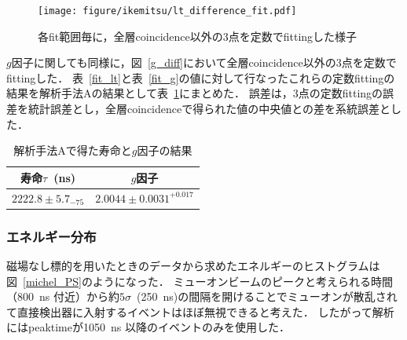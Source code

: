   \begin{figure}[H]
   \centering
   \texttt{[image: figure/ikemitsu/lt\_difference\_fit.pdf]}
   \caption{各fit範囲毎に，全層coincidence以外の3点を定数でfittingした様子}
   \label{lt_diff_fit}
  \end{figure}

  $g$因子に関しても同様に，図~\ref{g_diff}において全層coincidence以外の3点を定数でfittingした．
  表~\ref{fit_lt}と表~\ref{fit_g}の値に対して行なったこれらの定数fittingの結果を解析手法Aの結果として表~\ref{kaisekiA_matome}にまとめた．
  誤差は，3点の定数fittingの誤差を統計誤差とし，全層coincidenceで得られた値の中央値との差を系統誤差とした．

  \begin{table}[H]
   \caption{解析手法Aで得た寿命と$g$因子の結果}
   \label{kaisekiA_matome}
   \begin{center}
    \begin{tabular}{cc}\toprule
     寿命$\tau$~(ns)       &$g$因子 \\ \hline
     $2222.8\pm5.7 _{-75}$ &$2.0044\pm 0.0031^{+0.017}$ \\ \bottomrule
    \end{tabular}
   \end{center}
  \end{table}
  
  \subsubsection{エネルギー分布}
  磁場なし標的を用いたときのデータから求めたエネルギーのヒストグラムは図~\ref{michel_PS}のようになった．
  ミューオンビームのピークと考えられる時間（800~ns 付近）から約$5\sigma$~(250~ns)の間隔を開けることでミューオンが散乱されて直接検出器に入射するイベントはほぼ無視できると考えた．
  したがって解析にはpeaktimeが1050~ns 以降のイベントのみを使用した．
  
